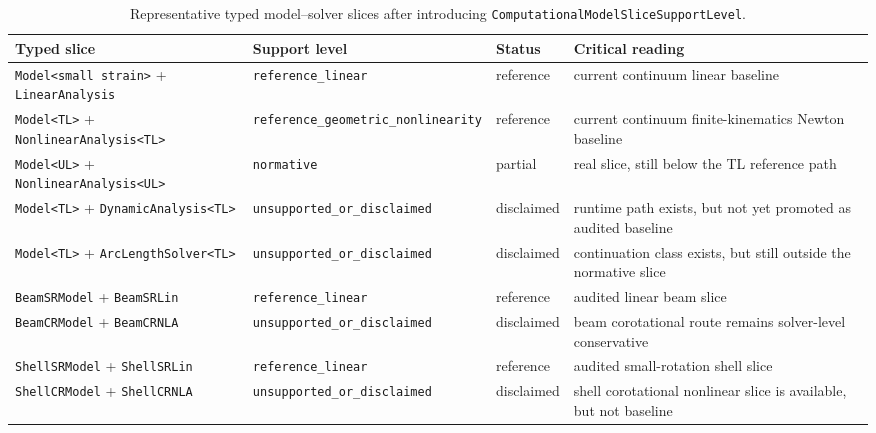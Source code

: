 \begin{table}[htbp]
  \centering
  \caption{Representative typed model--solver slices after introducing
  \texttt{ComputationalModelSliceSupportLevel}.}
  \label{tab:stage1-model-solver-slice-audit}
  \small
  \begin{tabular}{@{}llll@{}}
    \toprule
    \textbf{Typed slice} & \textbf{Support level} & \textbf{Status} &
    \textbf{Critical reading} \\
    \midrule
    \texttt{Model<small strain>} + \texttt{LinearAnalysis}
    & \texttt{reference\_linear}
    & reference
    & current continuum linear baseline \\[1mm]

    \texttt{Model<TL>} + \texttt{NonlinearAnalysis<TL>}
    & \texttt{reference\_geometric\_nonlinearity}
    & reference
    & current continuum finite-kinematics Newton baseline \\[1mm]

    \texttt{Model<UL>} + \texttt{NonlinearAnalysis<UL>}
    & \texttt{normative}
    & partial
    & real slice, still below the TL reference path \\[1mm]

    \texttt{Model<TL>} + \texttt{DynamicAnalysis<TL>}
    & \texttt{unsupported\_or\_disclaimed}
    & disclaimed
    & runtime path exists, but not yet promoted as audited baseline \\[1mm]

    \texttt{Model<TL>} + \texttt{ArcLengthSolver<TL>}
    & \texttt{unsupported\_or\_disclaimed}
    & disclaimed
    & continuation class exists, but still outside the normative slice \\[1mm]

    \texttt{BeamSRModel} + \texttt{BeamSRLin}
    & \texttt{reference\_linear}
    & reference
    & audited linear beam slice \\[1mm]

    \texttt{BeamCRModel} + \texttt{BeamCRNLA}
    & \texttt{unsupported\_or\_disclaimed}
    & disclaimed
    & beam corotational route remains solver-level conservative \\[1mm]

    \texttt{ShellSRModel} + \texttt{ShellSRLin}
    & \texttt{reference\_linear}
    & reference
    & audited small-rotation shell slice \\[1mm]

    \texttt{ShellCRModel} + \texttt{ShellCRNLA}
    & \texttt{unsupported\_or\_disclaimed}
    & disclaimed
    & shell corotational nonlinear slice is available, but not baseline \\
    \bottomrule
  \end{tabular}
\end{table}


